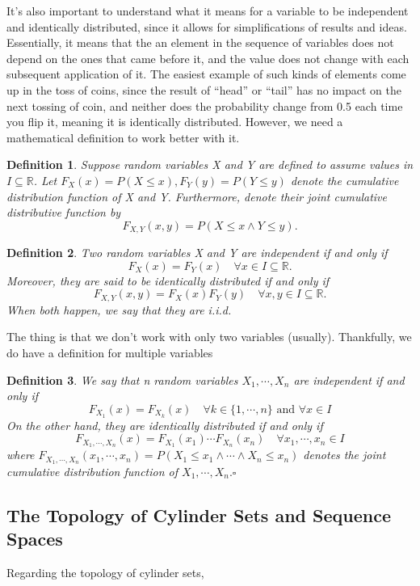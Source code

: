 \documentclass{article}
\newtheorem*{def*}{Definition}
\begin{document}
  It's also important to understand what it means for a variable to be independent and identically distributed, since it allows
for simplifications of results and ideas. Essentially, it means that the an element in the sequence of variables 
does not depend on the ones that came before it, and the value does not change with each subsequent application of it.
The easiest example of such kinds of elements come up in the toss of coins, since the result of ``head'' or ``tail''
has no impact on the next tossing of coin, and neither does the probability change from 0.5 each time you flip it,
meaning it is identically distributed. However, we need a mathematical definition to work better with it.
\begin{def*}
  Suppose random variables X and Y are defined to assume values in $I\subseteq{\mathbb{R}}$. Let $F_{X}(x) = P(X\leq{x}), 
F_{Y}(y) = P(Y\leq{y})$ denote the cumulative distribution function of X and Y. Furthermore, denote their joint cumulative
distributive function by
  $$
    F_{X, Y}(x, y) = P(X\leq{x}\wedge Y\leq{y}).
  $$
\end{def*}
 \begin{def*}
   Two random variables X and Y are independent if and only if
   $$
    F_{X}(x) = F_{Y}(x)\quad \forall x\in I\subseteq{\mathbb{R}}.
   $$
   Moreover, they are said to be identically distributed if and only if 
   $$
    F_{X, Y}(x, y)=F_{X}(x)F_{Y}(y)\quad \forall x, y\in I\subseteq{\mathbb{R}}.
   $$
   When both happen, we say that they are i.i.d.
 \end{def*}
  The thing is that we don't work with only two variables (usually). Thankfully, we do have a definition for multiple variables
 \begin{def*}
   We say that n random variables $X_{1},\cdots,X_{n}$ are independent if and only if 
   $$
   F_{X_{1}}(x) = F_{X_{k}}(x)\quad \forall k\in\{1,\cdots,n\}\text{ and }\forall x\in I
   $$
   On the other hand, they are identically distributed if and only if 
   $$
    F_{X_{1},\cdots,X_{n}}(x) = F_{X_{1}}(x_{1})\cdots F_{X_{n}}(x_{n})\quad \forall x_{1},\cdots,x_{n}\in I
   $$
 where $F_{X_{1},\cdots,X_{n}}(x_{1},\cdots,x_{n})=P(X_{1}\leq{x_{1}}\wedge\cdots\wedge X_{n}\leq{x_{n}})$ denotes the joint 
  cumulative distribution function of $X_{1},\cdots,X_{n}.\square$
 \end{def*}

\subsection{The Topology of Cylinder Sets and Sequence Spaces}
 Regarding the topology of cylinder sets, 
\end{document}
